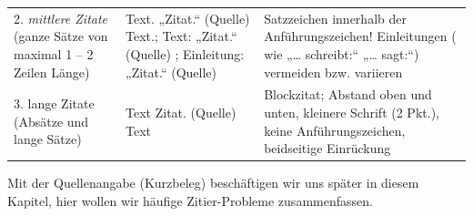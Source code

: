 \documentclass[]{book}
\theoremstyle{definition}
\theoremstyle{definition}
\theoremstyle{definition}
\theoremstyle{remark}
\begin{document}
\begin{longtable}[]{@{}lll@{}}
\begin{minipage}[t]{0.13\columnwidth}\raggedright\strut
2. \emph{mittlere Zitate} (ganze Sätze von maximal 1 -- 2 Zeilen
Länge)\strut
\end{minipage} & \begin{minipage}[t]{0.41\columnwidth}\raggedright\strut
Text. „Zitat.`` (Quelle) Text.; Text: „Zitat.`` (Quelle) ; Einleitung:
„Zitat.`` (Quelle)\strut
\end{minipage} & \begin{minipage}[t]{0.38\columnwidth}\raggedright\strut
Satzzeichen innerhalb der Anführungszeichen! Einleitungen ( wie
„\ldots{} schreibt:`` „\ldots{} sagt:``) vermeiden bzw. variieren
\vspace{-6mm}\strut
\end{minipage}\tabularnewline
\begin{minipage}[t]{0.13\columnwidth}\raggedright\strut
3. lange Zitate (Absätze und lange Sätze)\strut
\end{minipage} & \begin{minipage}[t]{0.41\columnwidth}\raggedright\strut
Text Zitat. (Quelle) Text\strut
\end{minipage} & \begin{minipage}[t]{0.38\columnwidth}\raggedright\strut
Blockzitat; Abstand oben und unten, kleinere Schrift (2 Pkt.), keine
Anführungszeichen, beidseitige Einrückung\strut
\end{minipage}\tabularnewline
\bottomrule
\end{longtable}

Mit der Quellenangabe (Kurzbeleg) beschäftigen wir uns später in diesem
Kapitel, hier wollen wir häufige Zitier-Probleme zusammenfassen.
\end{document}
